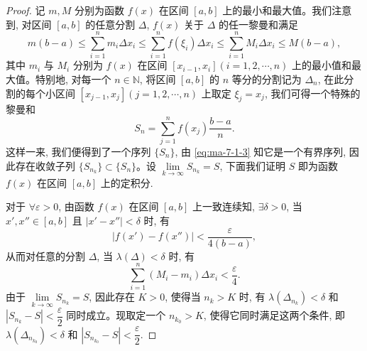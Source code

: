 \begin{proof}
记 $m,M$ 分别为函数 $f(x)$ 在区间 $[a,b]$ 上的最小和最大值。我们注意到, 对区间 $[a,b]$ 的任意分割 $\Delta$, $f(x)$ 关于 $\Delta$ 的任一黎曼和满足
\begin{equation}
  m(b-a)\leq \sum_{i=1}^n m_i\Delta x_i
  \leq \sum_{i=1}^n f(\xi_i)\Delta x_i
  \leq \sum_{i=1}^n M_i\Delta x_i
  \leq M(b-a),
  \label{eq:ma-7-1-3}
\end{equation}
其中 $m_i$ 与 $M_i$ 分别为 $f(x)$ 在区间 $[x_{i-1},x_i](i=1,2,\cdots,n)$ 上的最小值和最大值。特别地, 对每一个 $n\in\mathbb N$, 将区间 $[a,b]$ 的 $n$ 等分的分割记为 $\Delta_n$, 在此分割的每个小区间 $[x_{j-1},x_j](j=1,2,\cdots,n)$ 上取定 $\xi_j=x_j$, 我们可得一个特殊的黎曼和
\[
  S_n=\sum_{j=1}^n f(x_j)\frac{b-a}{n}.
\]
这样一来, 我们便得到了一个序列 $\{S_n\}$, 由 \eqref{eq:ma-7-1-3} 知它是一个有界序列, 因此存在收敛子列 $\{S_{n_k}\}\subset\{S_n\}$。设 $\lim\limits_{k\to\infty}S_{n_k}=S$, 下面我们证明 $S$ 即为函数 $f(x)$ 在区间 $[a,b]$ 上的定积分.

对于 $\forall\varepsilon>0$, 由函数 $f(x)$ 在区间 $[a,b]$ 上一致连续知, $\exists\delta>0$, 当 $x',x''\in[a,b]$ 且 $|x'-x''|<\delta$ 时, 有
\[
  |f(x')-f(x'')|<\frac{\varepsilon}{4(b-a)},
\]
从而对任意的分割 $\Delta$, 当 $\lambda(\Delta)<\delta$ 时, 有
\[
  \sum_{i=1}^n (M_i-m_i)\Delta x_i<\frac{\varepsilon}{4}.
\]
由于 $\lim\limits_{k\to\infty}S_{n_k}=S$, 因此存在 $K>0$, 使得当 $n_k>K$ 时, 有 $\lambda(\Delta_{n_k})<\delta$ 和 $|S_{n_k}-S|<\dfrac{\varepsilon}{2}$ 同时成立。现取定一个 $n_{k_0}>K$, 使得它同时满足这两个条件, 即 $\lambda(\Delta_{n_{k_0}})<\delta$ 和 $|S_{n_{k_0}}-S|<\dfrac{\varepsilon}{2}$.


\end{proof}
